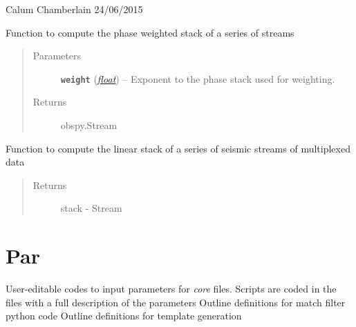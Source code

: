 \documentclass[a4paper,10pt,english]{sphinxmanual}
\begin{document}
Calum Chamberlain 24/06/2015

\begin{fulllineitems}
\label{modules:stacking.PWS_stack}
Function to compute the phase weighted stack of a series of streams
\begin{quote}\begin{description}
\item[{Parameters}] \leavevmode
\textbf{\texttt{weight}} (\href{https://docs.python.org/library/functions.html\#float}{\emph{float}}) -- Exponent to the phase stack used for weighting.

\item[{Returns}] \leavevmode
obspy.Stream

\end{description}\end{quote}

\end{fulllineitems}


\begin{fulllineitems}
\label{modules:stacking.linstack}
Function to compute the linear stack of a series of seismic streams of
multiplexed data
\begin{quote}\begin{description}
\item[{Returns}] \leavevmode
stack - Stream

\end{description}\end{quote}

\end{fulllineitems}



\chapter{Par}
\label{modules:par}
User-editable codes to input parameters for \emph{core} files.
Scripts are coded in the files with a full description of the parameters
\label{modules:module-match_filter_par}
Outline definitions for match filter python code
\label{modules:module-template_gen_par}
Outline definitions for template generation
\end{document}
